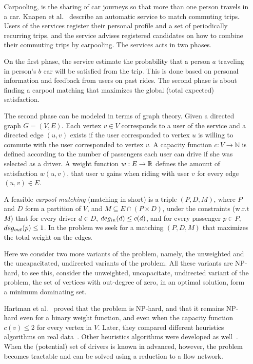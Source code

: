 Carpooling, is the sharing of car journeys so that more than one person travels
in a car.
Knapen et al.~\cite{knapen2013estimating} describe an automatic service
to match commuting trips.
Users of the services register their personal profile and a set of periodically
recurring trips, 
and the service advises registered candidates on how to combine their commuting
trips by carpooling.
The services acts in two phases. 

On the first phase, the service estimate the probability that a person $a$
traveling in person's $b$ car will be satisfied from the trip.
This is done based on personal information and feedback from users on past
rides.
The second phase is about finding a carpool matching
that maximizes the global (total expected) satisfaction.

The second phase can be modeled in terms of graph theory.
Given a directed graph $G = (V, E)$.
Each vertex $v \in V$ corresponds to a user of the service and a directed
edge $(u, v)$ exists if the user corresponded to vertex $u$ is willing to
commute with the user corresponded to vertex $v$.
A capacity function $ c: V \rightarrow \mathbb{N} $ is defined
according to the number of passengers each user can drive if she was
selected as a driver.
A weight function $w : E \rightarrow \mathbb{R} $ defines the amount of
satisfaction $w(u, v)$,
that user $u$ gains when riding with user $v$ for every edge $(u, v) \in E$.

A feasible \emph{carpool matching} (matching in short) is a triple 
$(P, D, M)$, where $P$ and $D$ form a partition of $V$, and 
$M \subseteq E \cap (P \times D)$,
under the constraints (w.r.t $M$) that for every driver $d \in D$, 
$deg_{in}(d) \leq c(d)$, 
and for every passenger $p \in P$, $deg_{out}(p) \leq 1$.
In the \textsc{\CARPOOL{}} problem we seek for a matching $(P, D, M)$ that maximizes the
total weight on the edges.

Here we consider two more variants of the problem, namely, 
the unweighted and the uncapacitated, undirected variants of the problem.
All these variants are NP-hard, to see this, 
consider the unweighted, uncapacitate, undirected variant of the problem, 
the set of vertices with out-degree of zero, in an optimal solution, 
form a minimum dominating set.  
  
Hartman et al.~\cite{hartman2013optimal} proved that the \emph{\CARPOOL{}} problem is
NP-hard, and that it remains NP-hard even for a binary weight function, and even when
the capacity function $c(v) \leq 2$ for every vertex in $V$.
Later, they compared different heuristics algorithms on real data~\cite{hartman2014theory}.
Other heuristics algorithms were developed as well~\cite{knapen2014exploiting}.
When the (potential) set of drivers is known in advanced, however, the problem becomes
tractable and can be solved using a reduction to a flow network.

